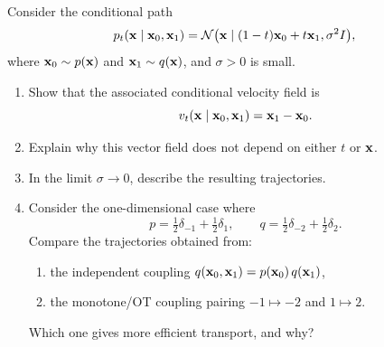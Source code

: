 \begin{exercise}
Consider the conditional path
\[
p_t({ \mathbf{x}}\mid { \mathbf{x}}_0,{ \mathbf{x}}_1)=\mathcal N\bigl({ \mathbf{x}} \mid (1-t){ \mathbf{x}}_0+t{ \mathbf{x}}_1,\sigma^2 I\bigr),
\]
where \({ \mathbf{x}}_0\sim p({ \mathbf{x}})\) and \({ \mathbf{x}}_1\sim q({ \mathbf{x}})\), and \(\sigma>0\) is small.

\begin{enumerate}
\item Show that the associated conditional velocity field is
\[
v_t({ \mathbf{x}}\mid { \mathbf{x}}_0,{ \mathbf{x}}_1)={ \mathbf{x}}_1-{ \mathbf{x}}_0.
\]
\item Explain why this vector field does not depend on either \(t\) or \({ \mathbf{x}}\).
\item In the limit \(\sigma\to 0\), describe the resulting trajectories.
\item Consider the one-dimensional case where
\[
p=\tfrac12\delta_{-1}+\tfrac12\delta_{1},
\qquad
q=\tfrac12\delta_{-2}+\tfrac12\delta_{2}.
\]
Compare the trajectories obtained from:
\begin{enumerate}
\item the independent coupling \(q({ \mathbf{x}}_0,{ \mathbf{x}}_1)=p({ \mathbf{x}}_0)\,q({ \mathbf{x}}_1)\),
\item the monotone/OT coupling pairing \(-1\mapsto -2\) and \(1\mapsto 2\).
\end{enumerate}
Which one gives more efficient transport, and why?
\end{enumerate}
\end{exercise}

